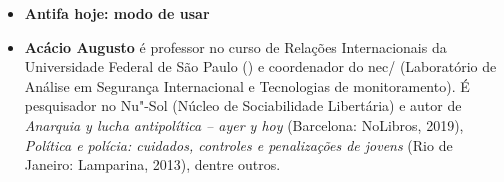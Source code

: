 \begin{itemize}
\item \textbf{Antifa hoje: modo de usar} \lipsum[1]

\item \textbf{Acácio Augusto} é professor no curso de Relações Internacionais da
  Universidade Federal de São Paulo () e coordenador do
  nec/ (Laboratório de Análise em Segurança Internacional e
  Tecnologias de monitoramento). É pesquisador no Nu"-Sol
  (Núcleo de Sociabilidade Libertária) e autor de
  \emph{Anarquia y lucha antipolítica -- ayer y hoy} (Barcelona:
    NoLibros, 2019), \emph{Política e polícia: cuidados, controles e
  penalizações de jovens} (Rio de Janeiro: Lamparina, 2013), dentre
  outros.

\end{itemize}

